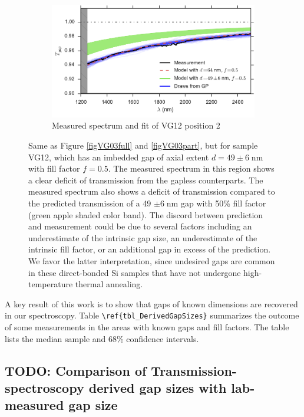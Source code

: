 \documentclass[osajnl,preprint,showpacs,superscriptaddress,12pt]{revtex4-1} %
\begin{document}
\begin{figure}[htbp]
        \begin{subfigure}[b]{0.5\textwidth}
                \includegraphics[width=\textwidth]{figs/VG12_f50.pdf}
                \caption{Measured spectrum and fit of VG12 position 2}
                \label{figVG12_f50}
        \end{subfigure}
\caption{ Same as Figure \ref{figVG03full} and \ref{figVG03part}, but for sample VG12, which has an imbedded gap of axial extent $d=49\pm6\;$nm with fill factor $f=0.5$.  The measured spectrum in this region shows a clear deficit of transmission from the gapless counterparts.  The measured spectrum also shows a deficit of transmission compared to the predicted transmission of a 49 $\pm6\;$nm gap with 50\% fill factor (green apple shaded color band).  The discord between prediction and measurement could be due to several factors including an underestimate of the intrinsic gap size, an underestimate of the intrinsic fill factor, or an additional gap in excess of the prediction.  We favor the latter interpretation, since undesired gaps are common in these direct-bonded Si samples that have not undergone high-temperature thermal annealing.
\label{figVG12}}
\end{figure}

A key result of this work is to show that gaps of known dimensions are recovered in our spectroscopy.  Table \verb|\ref{tbl_DerivedGapSizes}| summarizes the outcome of some measurements in the areas with known gaps and fill factors.  The table lists the median sample and 68\% confidence intervals.  

\subsection{TODO: Comparison of Transmission-spectroscopy derived gap sizes with lab-measured gap size}
\end{document}
